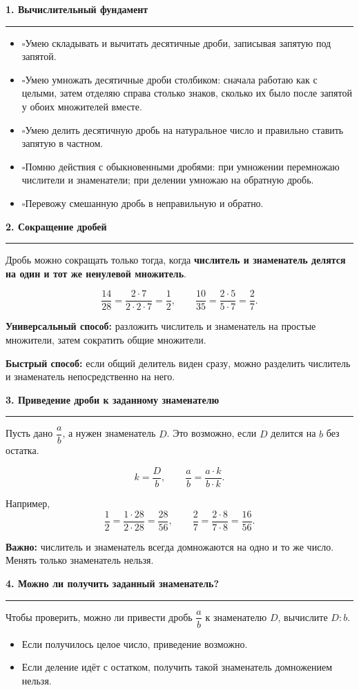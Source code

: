 \documentclass[a4paper,12pt]{article}
\newcommand{\topic}[1]{%
  \vspace{0.55em}%
  {\large\bfseries\color{darkaccent}#1}\par
  \vspace{0.15em}\color{lightline}\rule{\linewidth}{0.6pt}\color{textgray}\vspace{0.25em}
}
\newcommand{\key}[1]{\textbf{\color{darkaccent}#1}}
\newcommand{\checkitem}{\(\square\)\;}
\begin{document}
\topic{1. Вычислительный фундамент}
\begin{itemize}
  \item \checkitem Умею складывать и вычитать десятичные дроби, записывая запятую под запятой.
  \item \checkitem Умею умножать десятичные дроби столбиком: сначала работаю как с целыми, затем отделяю справа столько знаков, сколько их было после запятой у обоих множителей вместе.
  \item \checkitem Умею делить десятичную дробь на натуральное число и правильно ставить запятую в частном.
  \item \checkitem Помню действия с обыкновенными дробями: при умножении перемножаю числители и знаменатели; при делении умножаю на обратную дробь.
  \item \checkitem Перевожу смешанную дробь в неправильную и обратно.
\end{itemize}

\topic{2. Сокращение дробей}
Дробь можно сокращать только тогда, когда \key{числитель и знаменатель делятся на один и тот же ненулевой множитель}.

\[
\frac{14}{28}=\frac{2\cdot7}{2\cdot2\cdot7}=\frac12,
\qquad
\frac{10}{35}=\frac{2\cdot5}{5\cdot7}=\frac27.
\]

\key{Универсальный способ:} разложить числитель и знаменатель на простые множители, затем сократить общие множители.

\key{Быстрый способ:} если общий делитель виден сразу, можно разделить числитель и знаменатель непосредственно на него.

\topic{3. Приведение дроби к заданному знаменателю}
Пусть дано \(\dfrac{a}{b}\), а нужен знаменатель \(D\). Это возможно, если \(D\) делится на \(b\) без остатка.

\[
k=\frac{D}{b},\qquad
\frac{a}{b}=\frac{a\cdot k}{b\cdot k}.
\]

Например,
\[
\frac12=\frac{1\cdot28}{2\cdot28}=\frac{28}{56},
\qquad
\frac27=\frac{2\cdot8}{7\cdot8}=\frac{16}{56}.
\]

\key{Важно:} числитель и знаменатель всегда домножаются на одно и то же число. Менять только знаменатель нельзя.

\topic{4. Можно ли получить заданный знаменатель?}
Чтобы проверить, можно ли привести дробь \(\dfrac{a}{b}\) к знаменателю \(D\), вычислите \(D:b\).

\begin{itemize}
  \item Если получилось целое число, приведение возможно.
  \item Если деление идёт с остатком, получить такой знаменатель домножением нельзя.
\end{itemize}
\end{document}

